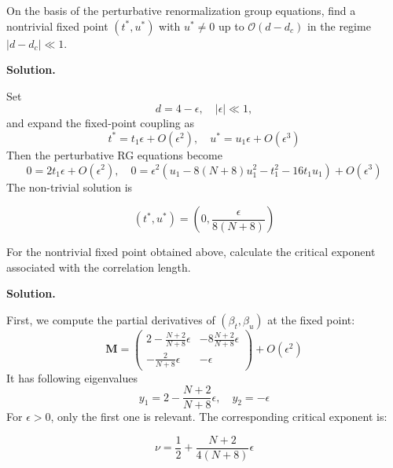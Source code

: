 \documentclass[11pt,a4paper]{article}
\newcounter{problem}
\newcounter{saveequation}
\newenvironment{solution}
{
	\par
	\setcounter{saveequation}{\value{equation}}
	\begingroup
	\setcounter{equation}{0}
	\renewcommand{\theequation}{\arabic{problem}.\arabic{equation}}
	\renewcommand{\theHequation}{sol.\arabic{problem}.\arabic{equation}}
	\noindent\textbf{Solution.}\quad
}
{
	\par
	\endgroup
	\setcounter{equation}{\value{saveequation}}
}
\begin{document}
	\begin{problembox}
		On the basis of the perturbative renormalization group equations, find a nontrivial fixed point $(t^*,u^*)$ with $u^*\neq 0$ up to $\mathcal{O}(d-d_c)$ in the regime $\lvert d-d_c\rvert\ll 1$.
	\end{problembox}
	\begin{solution}
		Set
		\[
		d=4-\epsilon,\quad |\epsilon|\ll 1,
		\]
		and expand the fixed-point coupling as
		\[
		t^*=t_1\epsilon+O(\epsilon^2),\quad u^*=u_1\epsilon+O(\epsilon^3)
		\]
		Then the perturbative RG equations become
		\begin{equation}
			0=2t_1\epsilon+O(\epsilon^2),\quad 0=\epsilon^2\left( u_1-8(N+8)u_1^2-t_1^2-16t_1u_1\right)+O(\epsilon^3)
		\end{equation}
		The non-trivial solution is
		\begin{finalanswer}
			\begin{equation}
				\label{fin:14}
				(t^*,u^*)=\left(0,\frac{\epsilon}{8(N+8)}\right)
			\end{equation}
		\end{finalanswer}
	\end{solution}

	\begin{problembox}
		For the nontrivial fixed point obtained above, calculate the critical exponent associated with the correlation length.
	\end{problembox}
	\begin{solution}
		First, we compute the partial derivatives of $(\beta_{t},\beta_u)$ at the fixed point:
		\begin{equation}
			\mathbf{M}=			
			\begin{pmatrix}
				2-\frac{N+2}{N+8}\epsilon & -8\frac{N+2 }{N+8}\epsilon
				\\[0.5em]
				-\frac{2}{N+8}\epsilon& -\epsilon 
			\end{pmatrix}+O(\epsilon^2)
		\end{equation}
		It has following eigenvalues
		\[
			y_1=2 - \frac{N+2}{N+8}\epsilon,\quad y_2=-\epsilon
		\]
		For $\epsilon>0$, only the first one is relevant. The corresponding critical exponent is:
		\begin{finalanswer}
			\begin{equation}
				\label{fin:15}
				\nu=\frac12 + \frac{N+2}{4(N+8)}\epsilon
			\end{equation}
		\end{finalanswer}
	\end{solution}
\end{document}
